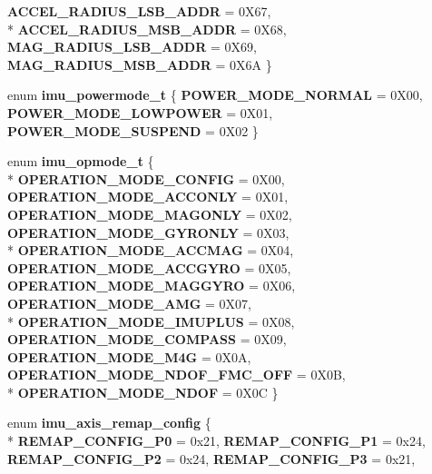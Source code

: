 \begin{DoxyCompactItemize}
{\bfseries A\-C\-C\-E\-L\-\_\-\-R\-A\-D\-I\-U\-S\-\_\-\-L\-S\-B\-\_\-\-A\-D\-D\-R} = 0\-X67, 
\\*
{\bfseries A\-C\-C\-E\-L\-\_\-\-R\-A\-D\-I\-U\-S\-\_\-\-M\-S\-B\-\_\-\-A\-D\-D\-R} = 0\-X68, 
{\bfseries M\-A\-G\-\_\-\-R\-A\-D\-I\-U\-S\-\_\-\-L\-S\-B\-\_\-\-A\-D\-D\-R} = 0\-X69, 
{\bfseries M\-A\-G\-\_\-\-R\-A\-D\-I\-U\-S\-\_\-\-M\-S\-B\-\_\-\-A\-D\-D\-R} = 0\-X6\-A
 \}
\item 
enum {\bfseries imu\-\_\-powermode\-\_\-t} \{ {\bfseries P\-O\-W\-E\-R\-\_\-\-M\-O\-D\-E\-\_\-\-N\-O\-R\-M\-A\-L} = 0\-X00, 
{\bfseries P\-O\-W\-E\-R\-\_\-\-M\-O\-D\-E\-\_\-\-L\-O\-W\-P\-O\-W\-E\-R} = 0\-X01, 
{\bfseries P\-O\-W\-E\-R\-\_\-\-M\-O\-D\-E\-\_\-\-S\-U\-S\-P\-E\-N\-D} = 0\-X02
 \}
\item 
enum {\bfseries imu\-\_\-opmode\-\_\-t} \{ \\*
{\bfseries O\-P\-E\-R\-A\-T\-I\-O\-N\-\_\-\-M\-O\-D\-E\-\_\-\-C\-O\-N\-F\-I\-G} = 0\-X00, 
{\bfseries O\-P\-E\-R\-A\-T\-I\-O\-N\-\_\-\-M\-O\-D\-E\-\_\-\-A\-C\-C\-O\-N\-L\-Y} = 0\-X01, 
{\bfseries O\-P\-E\-R\-A\-T\-I\-O\-N\-\_\-\-M\-O\-D\-E\-\_\-\-M\-A\-G\-O\-N\-L\-Y} = 0\-X02, 
{\bfseries O\-P\-E\-R\-A\-T\-I\-O\-N\-\_\-\-M\-O\-D\-E\-\_\-\-G\-Y\-R\-O\-N\-L\-Y} = 0\-X03, 
\\*
{\bfseries O\-P\-E\-R\-A\-T\-I\-O\-N\-\_\-\-M\-O\-D\-E\-\_\-\-A\-C\-C\-M\-A\-G} = 0\-X04, 
{\bfseries O\-P\-E\-R\-A\-T\-I\-O\-N\-\_\-\-M\-O\-D\-E\-\_\-\-A\-C\-C\-G\-Y\-R\-O} = 0\-X05, 
{\bfseries O\-P\-E\-R\-A\-T\-I\-O\-N\-\_\-\-M\-O\-D\-E\-\_\-\-M\-A\-G\-G\-Y\-R\-O} = 0\-X06, 
{\bfseries O\-P\-E\-R\-A\-T\-I\-O\-N\-\_\-\-M\-O\-D\-E\-\_\-\-A\-M\-G} = 0\-X07, 
\\*
{\bfseries O\-P\-E\-R\-A\-T\-I\-O\-N\-\_\-\-M\-O\-D\-E\-\_\-\-I\-M\-U\-P\-L\-U\-S} = 0\-X08, 
{\bfseries O\-P\-E\-R\-A\-T\-I\-O\-N\-\_\-\-M\-O\-D\-E\-\_\-\-C\-O\-M\-P\-A\-S\-S} = 0\-X09, 
{\bfseries O\-P\-E\-R\-A\-T\-I\-O\-N\-\_\-\-M\-O\-D\-E\-\_\-\-M4\-G} = 0\-X0\-A, 
{\bfseries O\-P\-E\-R\-A\-T\-I\-O\-N\-\_\-\-M\-O\-D\-E\-\_\-\-N\-D\-O\-F\-\_\-\-F\-M\-C\-\_\-\-O\-F\-F} = 0\-X0\-B, 
\\*
{\bfseries O\-P\-E\-R\-A\-T\-I\-O\-N\-\_\-\-M\-O\-D\-E\-\_\-\-N\-D\-O\-F} = 0\-X0\-C
 \}
\item 
enum {\bfseries imu\-\_\-axis\-\_\-remap\-\_\-config} \{ \\*
{\bfseries R\-E\-M\-A\-P\-\_\-\-C\-O\-N\-F\-I\-G\-\_\-\-P0} = 0x21, 
{\bfseries R\-E\-M\-A\-P\-\_\-\-C\-O\-N\-F\-I\-G\-\_\-\-P1} = 0x24, 
{\bfseries R\-E\-M\-A\-P\-\_\-\-C\-O\-N\-F\-I\-G\-\_\-\-P2} = 0x24, 
{\bfseries R\-E\-M\-A\-P\-\_\-\-C\-O\-N\-F\-I\-G\-\_\-\-P3} = 0x21, 

\end{DoxyCompactItemize}
